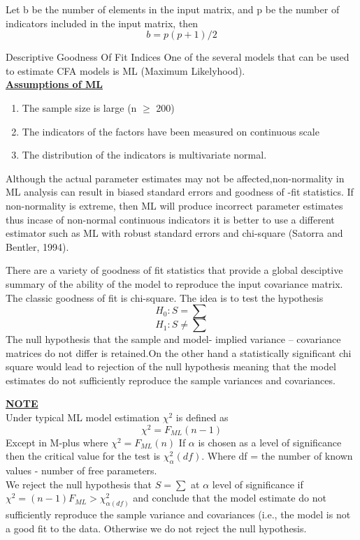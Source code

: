 \documentclass{beamer}
\begin{document}
\begin{frame}
	Let b be the number of elements in the input matrix, and p be the number of indicators included in the input matrix, then\\
	$$b = p(p + 1)/2$$
\end{frame}
\begin{frame}
	{Descriptive Goodness Of Fit Indices}
	One of the several models that can be used to estimate CFA models is ML (Maximum Likelyhood).\\
	\noindent \textbf{\underline{Assumptions of ML}}
	
	\begin{enumerate}
		\item The sample size is large (n $\geq$ 200)
		\item The indicators of the factors have been measured on continuous scale
		\item The distribution of the indicators is multivariate normal.
	\end{enumerate}
\end{frame}
\begin{frame}
Although the actual parameter estimates may not be affected,non-normality in ML analysis can result in biased standard errors and goodness of -fit statistics.
If non-normality is extreme, then ML will produce incorrect parameter estimates thus incase of non-normal continuous indicators it is better to use a different estimator such as ML with robust standard errors and chi-square (Satorra and Bentler, 1994).
\end{frame}
\begin{frame}
There are a variety of goodness of fit statistics that provide a global desciptive summary of the ability of the model to reproduce the input covariance matrix. The classic goodness of fit is chi-square.
The idea is to test the hypothesis
$$H_0: S= \sum$$
$$H_1: S \neq \sum$$
The null hypothesis that the sample and model- implied variance – covariance matrices do not differ is retained.On the other hand a statistically significant chi square would lead to rejection of the null hypothesis meaning that the model estimates do not sufficiently reproduce the sample variances and covariances.
\end{frame}
\begin{frame}
\noindent \textbf{\underline{NOTE}}\\
Under typical ML model estimation ${\chi}^2$ is defined as 
$$ {\chi}^2 = F_{ML}{(n-1)}$$ 
Except in M-plus where ${\chi}^2 = F_{ML}(n)$
If $\alpha$ is chosen as a level of significance then the critical value for the test is ${\chi}^2_\alpha (df)$. Where df = the number of known values - number of free parameters.\\
We reject the null hypothesis that $S= \sum$ at $\alpha$ level of significance if ${\chi}^2 = (n-1) F_{ML} > {\chi}^2_{\alpha (df)}$ and conclude that the model estimate do not sufficiently reproduce the sample variance and covariances (i.e., the model is not a good fit to the data. Otherwise we do not reject the null hypothesis.\\
\end{frame}
\end{document}
